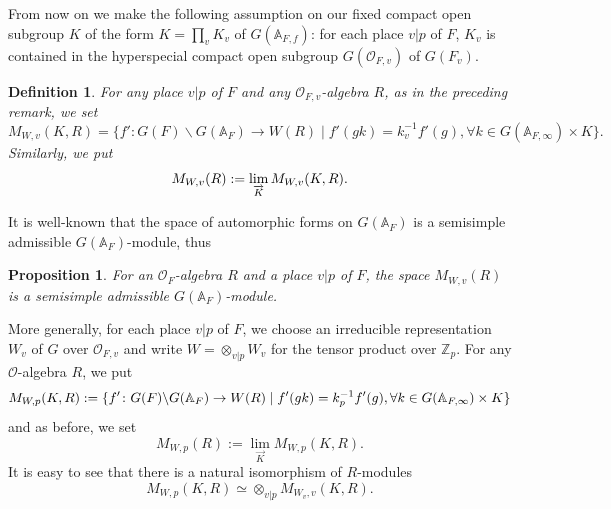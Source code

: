 \documentclass[12pt,oneside,reqno]{amsart}
\theoremstyle{plain}
\newtheorem{definition}[theorem]{Definition}
\newtheorem{proposition}[theorem]{Proposition}
\begin{document}
	
	
	
	
	
	From now on we make the following assumption on our fixed compact open subgroup $K$ of the form $K=\prod_vK_v$ of $G(\mathbb{A}_{F,f})$: for each place $v|p$ of $F$, $K_v$ is  contained in the hyperspecial compact open subgroup $G(\mathcal{O}_{F,v})$ of $G(F_v)$.
	
	
	
	\begin{definition}\label{M_{W,v}space of automorphic forms}
		For any place $v |p$ of $F$ and any $\mathcal{O}_{F,v}$-algebra $R$,
		as in the preceding remark, we set
		\[
		M_{W,v}(K,R)
		=
		\{
		f'\colon
		G(F)\backslash G(\mathbb{A}_F)
		\rightarrow
		W(R)\mid 
		f'(gk)=k_v^{-1}f'(g),
		\forall
		k\in
		G(\mathbb{A}_{F,\infty})\times K
		\}.
		\]
		Similarly, we put
		\[
		M_{W,v}(R)
		:=
		\lim\limits_{\overrightarrow{K}}
		M_{W,v}(K,R).\index{M@$M_{W,v}(K,R),M_{W,v}(R)$}
		\]
	\end{definition}
	
	
	It is well-known that the space of automorphic forms on $G(\mathbb{A}_F)$
	is a semisimple admissible $G(\mathbb{A}_F)$-module, thus
	\begin{proposition}\label{the space of modular forms is semisimple}
		For an
		$\mathcal{O}_F$-algebra $R$ and a place
		$v |p$ of $F$,
		the space
		$M_{W,v}(R)$
		is a semisimple
		admissible
		$G(\mathbb{A}_F)$-module.		
	\end{proposition}
	
	
	More generally, for each place $v|p$ of $F$, we choose an irreducible representation $W_v$ of $G$ over $\mathcal{O}_{F,v}$ and write $W=\otimes_{v|p}W_v$ for the tensor product over $\mathbb{Z}_p$. For any $\mathcal{O}$-algebra $R$, we put
	\begin{equation}\label{M_{W,p}(K,R)}
		M_{W,p}(K,R)
		:=
		\{
		f'\colon
		G(F)\backslash G(\mathbb{A}_F)
		\rightarrow
		W(R)\mid 
		f'(gk)=k_p^{-1}f'(g),\forall
		k\in G(\mathbb{A}_{F,\infty})\times K
		\}
		\index{M@$M_{W,p}(K,R)$}
	\end{equation}
	and as before, we set
	\[
	M_{W,p}(R)
	:=
	\lim\limits_{\overrightarrow{K}}
	M_{W,p}(K,R).
	\]
	It is easy to see that
	there is a natural isomorphism of $R$-modules
	\[
	M_{W,p}(K,R)
	\simeq
	\otimes_{v|p}
	M_{W_v,v}(K,R).
	\]
	
	
	
	
	
	
	
\end{document}
